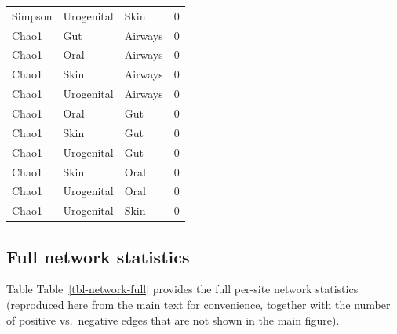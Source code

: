 \documentclass[
  letterpaper,
  DIV=11,
  numbers=noendperiod]{scrartcl}
\begin{document}
\begin{longtable}[]{@{}lllr@{}}
Simpson & Urogenital & Skin & 0 \\
Chao1 & Gut & Airways & 0 \\
Chao1 & Oral & Airways & 0 \\
Chao1 & Skin & Airways & 0 \\
Chao1 & Urogenital & Airways & 0 \\
Chao1 & Oral & Gut & 0 \\
Chao1 & Skin & Gut & 0 \\
Chao1 & Urogenital & Gut & 0 \\
Chao1 & Skin & Oral & 0 \\
Chao1 & Urogenital & Oral & 0 \\
Chao1 & Urogenital & Skin & 0 \\

\end{longtable}

\subsection{Full network statistics}\label{full-network-statistics}

Table Table~\ref{tbl-network-full} provides the full per-site network
statistics (reproduced here from the main text for convenience, together
with the number of positive vs.~negative edges that are not shown in the
main figure).
\end{document}
